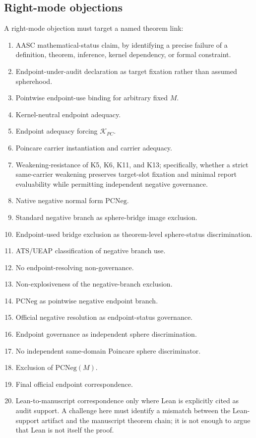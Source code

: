 \documentclass[11pt]{article}
\newcommand{\KPC}{\mathcal{K}_{PC}}
\newcommand{\PCNeg}{\mathrm{PCNeg}}
\begin{document}
\subsection{Right-mode objections}
A right-mode objection must target a named theorem link:
\begin{enumerate}[label=\arabic*.]
\item AASC mathematical-status claim, by identifying a precise failure of a definition, theorem, inference, kernel dependency, or formal constraint.
\item Endpoint-under-audit declaration as target fixation rather than assumed spherehood.
\item Pointwise endpoint-use binding for arbitrary fixed \(M\).
\item Kernel-neutral endpoint adequacy.
\item Endpoint adequacy forcing \(\KPC\).
\item Poincare carrier instantiation and carrier adequacy.
\item Weakening-resistance of K5, K6, K11, and K13; specifically, whether a strict same-carrier weakening preserves target-slot fixation and minimal report evaluability while permitting independent negative governance.
\item Native negative normal form \(\PCNeg\).
\item Standard negative branch as sphere-bridge image exclusion.
\item Endpoint-used bridge exclusion as theorem-level sphere-status discrimination.
\item ATS/UEAP classification of negative branch use.
\item No endpoint-resolving non-governance.
\item Non-explosiveness of the negative-branch exclusion.
\item \(\PCNeg\) as pointwise negative endpoint branch.
\item Official negative resolution as endpoint-status governance.
\item Endpoint governance as independent sphere discrimination.
\item No independent same-domain Poincare sphere discriminator.
\item Exclusion of \(\PCNeg(M)\).
\item Final official endpoint correspondence.
\item Lean-to-manuscript correspondence only where Lean is explicitly cited as audit support. A challenge here must identify a mismatch between the Lean-support artifact and the manuscript theorem chain; it is not enough to argue that Lean is not itself the proof.
\end{enumerate}
\end{document}
